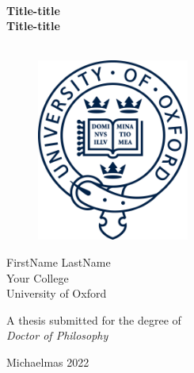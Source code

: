 \begin{titlepage}
	\begin{center}
		\HRule\\[0.9cm]
		{\huge\bfseries Title-title}\\
		\vspace{3mm}
		{\huge\bfseries Title-title}\\[0.0cm]
		\HRule \\[0.5cm]
		\makeatletter
		\renewcommand{\thesection}{\@arabic\c@section}
		
		\vspace{10mm}

		\begin{figure}[H]
			\begin{center}
				\includegraphics[width=5cm]{asset/oxford_logo.png}
				\label{ox_logo}
			\end{center}
		\end{figure}

		
		\makeatother
		\vspace{0mm}
		{\large {FirstName LastName}}\\
		{\large
		Your College\\
		University of Oxford}\\[0.5cm]

		\vspace{10mm}

		\vspace{3mm}
		{\large {A thesis submitted for the degree of\\
		 \textit{Doctor of Philosophy}}}\\
		\vspace{3mm}

		{\large Michaelmas 2022}
		
	\end{center}
	
\end{titlepage}
